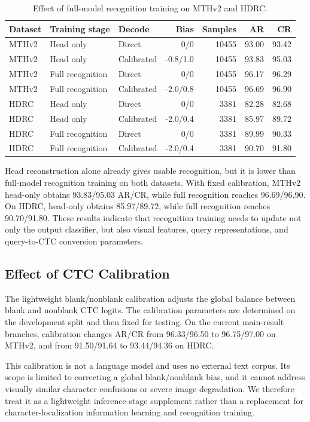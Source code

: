 \begin{table}[t]
\centering
\caption{Effect of full-model recognition training on MTHv2 and HDRC.}
\label{tab:head-full}
\begin{tabular}{lllrrrr}
\toprule
Dataset & Training stage & Decode & Bias & Samples & AR & CR \\
\midrule
MTHv2 & Head only & Direct & 0/0 & 10455 & 93.00 & 93.42 \\
MTHv2 & Head only & Calibrated & -0.8/1.0 & 10455 & 93.83 & 95.03 \\
MTHv2 & Full recognition & Direct & 0/0 & 10455 & 96.17 & 96.29 \\
MTHv2 & Full recognition & Calibrated & -2.0/0.8 & 10455 & 96.69 & 96.90 \\
HDRC & Head only & Direct & 0/0 & 3381 & 82.28 & 82.68 \\
HDRC & Head only & Calibrated & -2.0/0.4 & 3381 & 85.97 & 89.72 \\
HDRC & Full recognition & Direct & 0/0 & 3381 & 89.99 & 90.33 \\
HDRC & Full recognition & Calibrated & -2.0/0.4 & 3381 & 90.70 & 91.80 \\
\bottomrule
\end{tabular}
\end{table}

Head reconstruction alone already gives usable recognition, but it is lower than full-model recognition training on both datasets. With fixed calibration, MTHv2 head-only obtains 93.83/95.03 AR/CR, while full recognition reaches 96.69/96.90. On HDRC, head-only obtains 85.97/89.72, while full recognition reaches 90.70/91.80. These results indicate that recognition training needs to update not only the output classifier, but also visual features, query representations, and query-to-CTC conversion parameters.

\subsection{Effect of CTC Calibration}

The lightweight blank/nonblank calibration adjusts the global balance between blank and nonblank CTC logits. The calibration parameters are determined on the development split and then fixed for testing. On the current main-result branches, calibration changes AR/CR from 96.33/96.50 to 96.75/97.00 on MTHv2, and from 91.50/91.64 to 93.44/94.36 on HDRC.

This calibration is not a language model and uses no external text corpus. Its scope is limited to correcting a global blank/nonblank bias, and it cannot address visually similar character confusions or severe image degradation. We therefore treat it as a lightweight inference-stage supplement rather than a replacement for character-localization information learning and recognition training.

